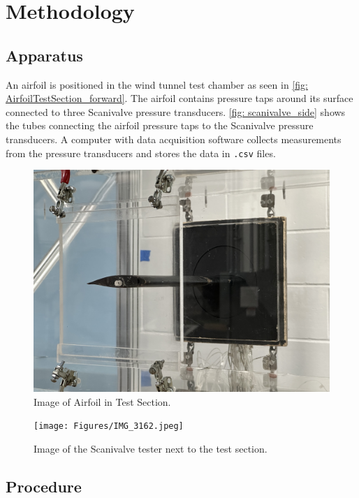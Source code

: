 \chapter{Methodology}
\label{cp:methodology}

\section{Apparatus}\label{sec:apparatus}

An airfoil is positioned in the wind tunnel test chamber as seen in \autoref{fig: AirfoilTestSection_forward}. The airfoil contains pressure taps around its surface connected to three Scanivalve pressure transducers. \autoref{fig: scanivalve_side} shows the tubes connecting the airfoil pressure taps to the Scanivalve pressure transducers. A computer with data acquisition software collects measurements from the pressure transducers and stores the data in \verb|.csv| files.

\begin{figure}[htpb]
    \centering
    \includegraphics[width=0.75\linewidth]{Figures/IMG_3160.jpeg}
    \caption[Image of Airfoil in Test Section.]{Image of Airfoil in Test Section.}
    \label{fig: AirfoilTestSection_forward}
\end{figure}

\begin{figure}[htpb]
    \centering
    \texttt{[image: Figures/IMG\_3162.jpeg]}
    \caption[Image of the Scanivalve tester next to the test section.]{Image of the Scanivalve tester next to the test section.}
    \label{fig: scanivalve_side}
\end{figure}

\newpage
\section{Procedure}\label{sec:procedures}

